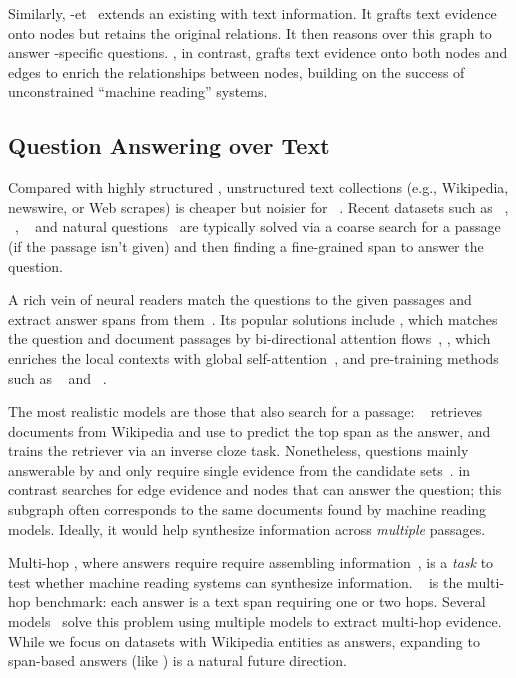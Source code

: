 Similarly, {-\small et}~\cite{sun2018open} extends an existing  with 
text information.
%
It grafts text evidence onto  nodes but retains the original  relations.
%
It then reasons over this graph to answer -specific questions.
%
\name{}, in contrast, grafts text evidence onto both nodes and edges
to enrich the relationships between nodes, building on
the success of unconstrained ``machine reading''  systems.

\subsection{Question Answering over Text}

Compared with highly structured , unstructured text
collections (e.g., Wikipedia, newswire, or Web scrapes) is cheaper but
noisier for ~\cite{chen2018neural}.
%
Recent datasets such as \squad{}~\cite{rajpurkar2016squad},
\triviaqa{}~\cite{joshi2017triviaqa}, ~\cite{marco} and
natural questions~\cite{kwiatkowski2019natural} are typically solved
via a coarse search for a passage (if the passage isn't given) and
then finding a fine-grained span to answer the question.

A rich vein of neural readers match the questions to the given
passages and extract answer spans from them~\cite[inter
  alia]{seo2016bidirectional, yu2018qanet}.  Its popular solutions
include , which matches the question and document passages
by bi-directional attention flows~\cite{seo2016bidirectional},
, which enriches the local contexts with global
self-attention~\cite{yu2018qanet}, and pre-training methods such as
~\cite{devlin2018bert} and ~\cite{yang2019xlnet}.

The most realistic models are those that also search for a passage:
%
\drqa{}~\cite{chen2017reading} retrieves documents from Wikipedia and
use  to predict the top span as the answer, and
~\cite{lee-19} trains the retriever via an inverse cloze
task.
%
Nonetheless, questions mainly answerable by \drqa{} and  only require
single evidence from the candidate sets~\cite{min2018efficient}.
%
\name{} in contrast searches for edge evidence and nodes that can
answer the question; this subgraph often corresponds to the same
documents found by machine reading models.
%
Ideally, it would help synthesize information across \emph{multiple}
passages.


Multi-hop , where answers require require assembling
information~\citep{welbl2018constructing, yang2018hotpotqa}, is a
\emph{task} to test whether machine reading systems can
synthesize information.
%
~\cite{yang2018hotpotqa} is the 
 multi-hop  benchmark: each answer is a text span requiring 
one or two hops.
%
Several models~\cite{qiu-etal-2019-dynamically,
  ding-etal-2019-cognitive, min2019multi} solve
this problem using multiple  models to extract multi-hop
evidence.
%
While we focus on datasets with Wikipedia entities as
answers, expanding \name{} to span-based answers (like ) is a
natural future direction.




